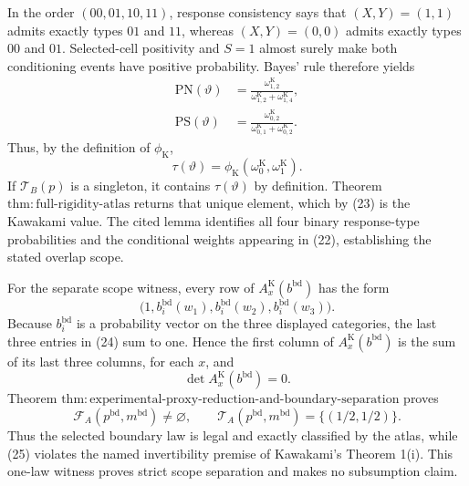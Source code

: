 In the order \((00,01,10,11)\), response consistency says that \((X,Y)=(1,1)\) admits exactly types \(01\) and \(11\), whereas \((X,Y)=(0,0)\) admits exactly types \(00\) and \(01\).  Selected-cell positivity and \(S=1\) almost surely make both conditioning events have positive probability.  Bayes' rule therefore yields
\[
 \begin{aligned}
 \mathrm{PN}(\vartheta)
 &=\frac{\omega^{\mathrm K}_{1,2}}
         {\omega^{\mathrm K}_{1,2}+\omega^{\mathrm K}_{1,4}},\\
 \mathrm{PS}(\vartheta)
 &=\frac{\omega^{\mathrm K}_{0,2}}
         {\omega^{\mathrm K}_{0,1}+\omega^{\mathrm K}_{0,2}}.
 \end{aligned}                                             \tag{22}
\]
Thus, by the definition of \(\phi_{\mathrm K}\),
\[
 \tau(\vartheta)
 =\phi_{\mathrm K}(\omega_0^{\mathrm K},\omega_1^{\mathrm K}). \tag{23}
\]
If \(\mathcal T_B(p)\) is a singleton, it contains \(\tau(\vartheta)\) by definition.  Theorem \(\mathrm{thm{:}full\text{-}rigidity\text{-}atlas}\) returns that unique element, which by (23) is the Kawakami value.  The cited lemma identifies all four binary response-type probabilities and the conditional weights appearing in (22), establishing the stated overlap scope.

For the separate scope witness, every row of \(A_x^{\mathrm K}(b^{\mathrm{bd}})\) has the form
\[
 \bigl(1,b_i^{\mathrm{bd}}(w_1),
          b_i^{\mathrm{bd}}(w_2),b_i^{\mathrm{bd}}(w_3)\bigr). \tag{24}
\]
Because \(b_i^{\mathrm{bd}}\) is a probability vector on the three displayed categories, the last three entries in (24) sum to one.  Hence the first column of \(A_x^{\mathrm K}(b^{\mathrm{bd}})\) is the sum of its last three columns, for each \(x\), and
\[
 \det A_x^{\mathrm K}(b^{\mathrm{bd}})=0.                  \tag{25}
\]
Theorem \(\mathrm{thm{:}experimental\text{-}proxy\text{-}reduction\text{-}and\text{-}boundary\text{-}separation}\) proves
\[
 \mathcal F_A(p^{\mathrm{bd}},m^{\mathrm{bd}})\ne\varnothing,
 \qquad
 \mathcal T_A(p^{\mathrm{bd}},m^{\mathrm{bd}})
 =\{(1/2,1/2)\}.                                          \tag{26}
\]
Thus the selected boundary law is legal and exactly classified by the atlas, while (25) violates the named invertibility premise of Kawakami's Theorem 1(i).  This one-law witness proves strict scope separation and makes no subsumption claim.

